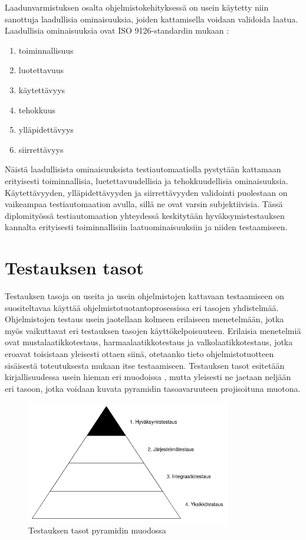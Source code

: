   Laadunvarmistuksen osalta ohjelmistokehityksessä on usein käytetty niin sanottuja laadullisia ominaisuuksia, joiden kattamisella voidaan validoida laatua.
  Laadullisia ominaisuuksia ovat ISO 9126-standardin mukaan \parencite{iso_quality_attributes}:

  \begin{enumerate}
    \item toiminnallisuus
    \item luotettavuus
    \item käytettävyys
    \item tehokkuus
    \item ylläpidettävyys
    \item siirrettävyys
  \end{enumerate}

  Näistä laadullisista ominaisuuksista testiautomaatiolla pystytään kattamaan erityisesti toiminnallisia, luetettavuudellisia ja tehokkuudellisia ominaisuuksia.
  Käytettävyyden, ylläpidettävyyden ja siirrettävyyden validointi puolestaan on vaikeampaa testiautomaation avulla, sillä ne ovat varsin subjektiivisia.
  Tässä diplomityössä testiautomaation yhteydessä keskitytään hyväksymistestauksen kannalta erityisesti toiminnallisiin laatuominaisuuksiin ja niiden testaamiseen.

\section{Testauksen tasot} \label{ch:07_testauksen_tasot}

  Testauksen tasoja on useita ja usein ohjelmistojen kattavaan testaamiseen on suositeltavaa käyttää ohjelmistotuotantoprosessissa eri tasojen yhdistelmää.
  Ohjelmistojen testaus usein jaotellaan kolmeen erilaiseen menetelmään, jotka myös vaikuttavat eri testauksen tasojen käyttökelpoisuuteen.
  Erilaisia menetelmiä ovat mustalaatikkotestaus, harmaalaatikkotestaus ja valkolaatikkotestaus, jotka eroavat toisistaan yleisesti ottaen siinä, otetaanko tieto ohjelmistotuotteen sisäisestä toteutuksesta mukaan itse testaamiseen.
  Testauksen tasot esitetään kirjallisuudessa usein hieman eri muodoissa \parencite{testing_levels_1} \parencite{testing_levels_2}, mutta yleisesti ne jaetaan neljään eri tasoon, jotka voidaan kuvata pyramidin tasoavaruuteen projisoituna muotona.

  \begin{figure}[H]
    \centering
    \includegraphics[width=0.8\textwidth]{assets/testauksen-tasot.png}
    \caption{Testauksen tasot pyramidin muodossa}
    \label{fig:testing-levels-pyramid}
  \end{figure}

